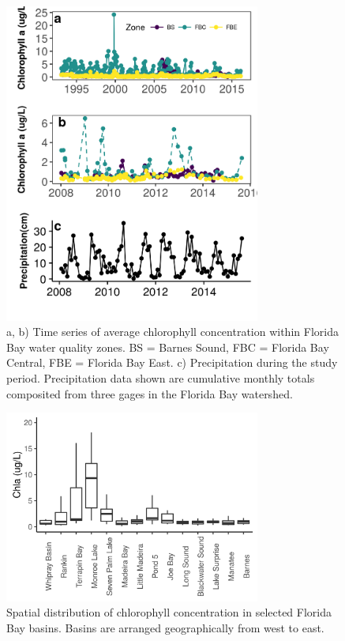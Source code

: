 \newpage

\begin{figure}
  \centering
  \includegraphics[width=0.75\textwidth]{../../figures/chltimeseries.png}
  \caption{a, b) Time series of average chlorophyll concentration within Florida Bay water quality zones. BS = Barnes Sound, FBC = Florida Bay Central, FBE = Florida Bay East. c) Precipitation during the study period. Precipitation data shown are cumulative monthly totals composited from three gages in the Florida Bay watershed.}
  \label{fig:2}
\end{figure}

\newpage

\begin{figure}
  \centering
  \includegraphics[width=0.75\textwidth]{../../figures/chlboxplot.png}
  \caption{Spatial distribution of chlorophyll concentration in selected Florida Bay basins. Basins are arranged geographically from west to east.}
  \label{fig:3}
\end{figure}

